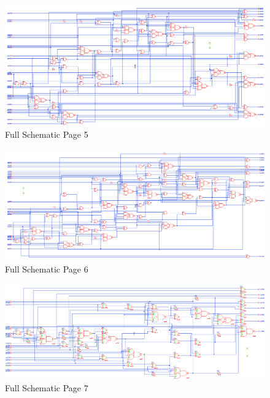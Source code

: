 \documentclass[11pt]{article}
\begin{document}
		
		\begin{figure}[H] 
			\centering 
			\includegraphics[width=\textwidth,height=\dimexpr\textheight-4\baselineskip-\abovecaptionskip-\belowcaptionskip\relax,keepaspectratio]{"Pictures/Full Schematic Page 5"}
			\caption{Full Schematic Page 5} 
			\label{fig:Full-Schematic-Page-5} 
		\end{figure}
		
		
		\begin{figure}[H] 
			\centering 
			\includegraphics[width=\textwidth,height=\dimexpr\textheight-4\baselineskip-\abovecaptionskip-\belowcaptionskip\relax,keepaspectratio]{"Pictures/Full Schematic Page 6"}
			\caption{Full Schematic Page 6} 
			\label{fig:Full-Schematic-Page-6} 
		\end{figure}
		
		
		\begin{figure}[H] 
			\centering 
			\includegraphics[width=\textwidth,height=\dimexpr\textheight-4\baselineskip-\abovecaptionskip-\belowcaptionskip\relax,keepaspectratio]{"Pictures/Full Schematic Page 7"}
			\caption{Full Schematic Page 7} 
			\label{fig:Full-Schematic-Page-7} 
		\end{figure}
		
\end{document}
